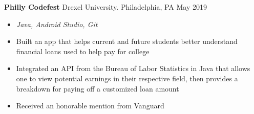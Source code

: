 \documentclass[10pt]{article}
\newcommand{\resumesection}[1]{\vspace{-0.2cm}\section*{#1}\vspace{-0.2cm}\hrule\vspace{0.2cm}}
\begin{document}
\textbf{Philly Codefest} Drexel University. Philadelphia, PA \hfill May 2019\par
\begin{itemize}
	\item \textit{Java, Android Studio, Git}
	\item Built an app that helps current and future students better understand financial loans used to help pay for college
	\item Integrated an API from the Bureau of Labor Statistics in Java that allows one to view potential earnings in their respective field, then provides a breakdown for paying off a customized loan amount
	\item Received an honorable mention from Vanguard
\end{itemize}




%
%
\end{document}
